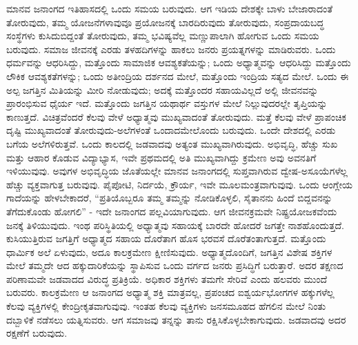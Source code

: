 ಮಾನವ ಜನಾಂಗದ ಇತಿಹಾಸದಲ್ಲಿ ಒಂದು ಸಮಯ ಬರುವುದು. ಆಗ ಇಡಿಯ ದೇಶಕ್ಕೇ ಬಾಳು ಬೇಜಾರಾದಂತೆ ತೋರುವುದು, ತಮ್ಮ ಯೋಜನೆಗಳಾವುವೂ ಪ್ರಯೋಜನಕ್ಕೆ ಬಾರದಿರುವುದು ತೋರುವುದು, ಸಂಪ್ರದಾಯಬದ್ಧ ಸಂಸ್ಥೆಗಳು ಕುಸಿದುಬಿದ್ದಂತೆ ತೋರುವುದು, ತಮ್ಮ ಭವಿಷ್ಯವೆಲ್ಲ ಮಣ್ಣುಪಾಲಾಗಿ ಹೋಗುವ ಒಂದು ಸಮಯ ಬರುವುದು. ಸಮಾಜ ಜೀವನಕ್ಕೆ ಎರಡು ತಳಹದಿಗಳನ್ನು ಹಾಕಲು ಜನರು ಪ್ರಯತ್ನಗಳನ್ನು ಮಾಡಿರುವರು. ಒಂದು ಧರ್ಮವನ್ನು ಆಧರಿಸಿದ್ದು, ಮತ್ತೊಂದು ಸಾಮಾಜಿಕ ಆವಶ್ಯಕತೆಯನ್ನು; ಒಂದು ಅಧ್ಯಾತ್ಮವನ್ನು ಆಧರಿಸಿದ್ದು ಮತ್ತೊಂದು ಲೌಕಿಕ ಆವಶ್ಯಕತೆಗಳನ್ನು; ಒಂದು ಅತೀಂದ್ರಿಯ ದರ್ಶನದ ಮೇಲೆ, ಮತ್ತೊಂದು ಇಂದ್ರಿಯ ಸತ್ಯದ ಮೇಲೆ. ಒಂದು ಈ ಅಲ್ಪ ಜಗತ್ತಿನ ಮಿತಿಯನ್ನು ಮೀರಿ ನೋಡುವುದು; ಅದಕ್ಕೆ ಮತ್ತೊಂದರ ಸಹಾಯವಿಲ್ಲದೆ ಅಲ್ಲಿ ಜೀವನವನ್ನು ಪ್ರಾರಂಭಿಸುವ ಧೈರ್ಯ ಇದೆ. ಮತ್ತೊಂದು ಜಗತ್ತಿನ ಯಥಾರ್ಥ ವಸ್ತುಗಳ ಮೇಲೆ ನಿಲ್ಲುವುದರಲ್ಲೇ ತೃಪ್ತಿಯನ್ನು ಕಾಣುತ್ತದೆ. ವಿಚಿತ್ರವೆಂದರೆ ಕೆಲವು ವೇಳೆ ಅಧ್ಯಾತ್ಮವು ಮುಖ್ಯವಾದಂತೆ ತೋರುವುದು. ಮತ್ತೆ ಕೆಲವು ವೇಳೆ ಪ್ರಾಪಂಚಿಕ ದೃಷ್ಟಿ ಮುಖ್ಯವಾದಂತೆ ತೋರುವುದು-ಅಲೆಗಳಂತೆ ಒಂದಾದಮೇಲೊಂದು ಬರುವುದು. ಒಂದೇ ದೇಶದಲ್ಲಿ ಎರಡು ಬಗೆಯ ಅಲೆಗಳಿರುತ್ತವೆ. ಒಂದು ಕಾಲದಲ್ಲಿ ಜಡವಾದವು ಅತ್ಯಂತ ಮುಖ್ಯವಾಗಿರುವುದು. ಅಭಿವೃದ್ಧಿ, ಹೆಚ್ಚು ಸುಖ ಮತ್ತು ಆಹಾರ ಕೊಡುವ ವಿದ್ಯಾಭ್ಯಾಸ, ಇವೇ ಪ್ರಥಮದಲ್ಲಿ ಅತಿ ಮುಖ್ಯವಾಗಿದ್ದು ಕ್ರಮೇಣ ಅವು ಅವನತಿಗೆ ಇಳಿಯುವುವು. ಅವುಗಳ ಅಭಿವೃದ್ಧಿಯ ಜೊತೆಯಲ್ಲೇ ಮಾನವ ಜನಾಂಗದಲ್ಲಿ ಸುಪ್ತವಾಗಿರುವ ದ್ವೇಷ-ಅಸೂಯೆಗಳೆಲ್ಲ ಹೆಚ್ಚು ವ್ಯಕ್ತವಾಗುತ್ತ ಬರುವುವು. ಪೈಪೋಟಿ, ನಿರ್ದಯೆ, ಕ್ರೌರ್ಯ, ಇವೇ ಮೂಲಮಂತ್ರವಾಗುವುವು. ಒಂದು ಆಂಗ್ಲೇಯ ಗಾದೆಯನ್ನು ಹೇಳಬೇಕಾದರೆ, “ಪ್ರತಿಯೊಬ್ಬರೂ ತಮ್ಮ ತಮ್ಮನ್ನು ನೋಡಿಕೊಳ್ಳಲಿ, ಸೈತಾನನು ಹಿಂದೆ ಬಿದ್ದವನನ್ನು ತೆಗೆದುಕೊಂಡು ಹೋಗಲಿ” - ಇದೇ ಜನಾಂಗದ ಪಲ್ಲವಿಯಾಗುವುದು. ಆಗ ಜೀವನಕ್ರಮವೇ ನಿಷ್ಪ್ರಯೋಜಕವೆಂದು ಜನಕ್ಕೆ ತಿಳಿಯುವುದು. ಇಂಥ ಪರಿಸ್ಥಿತಿಯಲ್ಲಿ ಅಧ್ಯಾತ್ಮವು ಸಹಾಯಕ್ಕೆ ಬಾರದೇ ಹೋದರೆ ಜಗತ್ತೇ ನಾಶಹೊಂದುತ್ತದೆ. ಕುಸಿಯುತ್ತಿರುವ ಜಗತ್ತಿಗೆ ಅಧ್ಯಾತ್ಮದ ಸಹಾಯ ದೊರೆತಾಗ ಹೊಸ ಭರವಸೆ ದೊರೆತಂತಾಗುತ್ತದೆ. ಮತ್ತೊಂದು ಧಾರ್ಮಿಕ ಅಲೆ ಏಳುವುದು, ಅದೂ ಕಾಲಕ್ರಮೇಣ ಕ್ಷೀಣಿಸುವುದು. ಅಧ್ಯಾತ್ಮದೊಂದಿಗೆ, ಜಗತ್ತಿನ ವಿಶೇಷ ಶಕ್ತಿಗಳ ಮೇಲೆ ತಮ್ಮದೇ ಆದ ಹಕ್ಕುದಾರಿಕೆಯನ್ನು ಸ್ಥಾಪಿಸುವ ಒಂದು ವರ್ಗದ ಜನರು ಪ್ರಸಿದ್ಧಿಗೆ ಬರುತ್ತಾರೆ. ಅದರ ತಕ್ಷಣದ ಪರಿಣಾಮವೇ ಜಡವಾದದ ವಿರುದ್ಧ ಪ್ರತಿಕ್ರಿಯೆ. ಅಧಿಕಾರ ಶಕ್ತಿಗಳು ತಮಗೇ ಸೇರಿವೆ ಎಂದು ಹಲವರು ಮುಂದೆ ಬರುವರು. ಕಾಲಕ್ರಮೇಣ ಆ ಜನಾಂಗದ ಅಧ್ಯಾತ್ಮ ಶಕ್ತಿ ಮಾತ್ರವಲ್ಲ, ಪ್ರಪಂಚದ ಐಶ್ವರ್ಯಭೋಗಗಳ ಹಕ್ಕುಗಳೆಲ್ಲ ಕೆಲವು ವ್ಯಕ್ತಿಗಳಲ್ಲಿ ಕೇಂದ್ರೀಕೃತವಾಗುವುವು. ಇಂತಹ ಕೆಲವು ವ್ಯಕ್ತಿಗಳು ಜನಸಮೂಹದ ಹೆಗಲಿನ ಮೇಲೆ ನಿಂತು ದಬ್ಬಾಳಿಕೆ ನಡೆಸಲು ಯತ್ನಿಸುವರು. ಆಗ ಸಮಾಜವು ತನ್ನನ್ನು ತಾನು ರಕ್ಷಿಸಿಕೊಳ್ಳಬೇಕಾಗುವುದು. ಜಡವಾದವು ಅದರ ರಕ್ಷಣೆಗೆ ಬರುವುದು.

